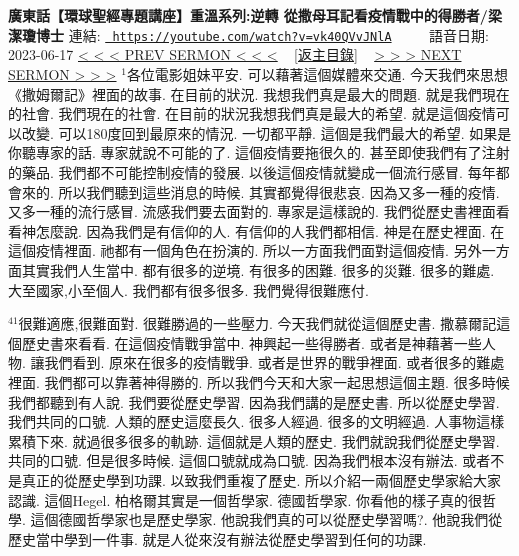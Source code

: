 \documentclass{book}
\begin{document}
\section{}
\label{sec:vk40QVvJNlA}
\textbf{廣東話【環球聖經專題講座】重溫系列:逆轉 從撒母耳記看疫情戰中的得勝者/梁潔瓊博士}
\newline
\newline
連結: \href{https://youtube.com/watch?v=vk40QVvJNlA}{\texttt{ https://youtube.com/watch?v=vk40QVvJNlA}} ~~~~ 語音日期: 2023-06-17 
\newline
\newline
\hyperref[sec:ok2q_ar3Xrg]{\small{< < < PREV SERMON < < <}}
~
\hyperref[sec:index]{\small{[返主目錄]}}
~
\hyperref[sec:SwgE3Jqj0fE]{\small{> > > NEXT SERMON > > >}}
\newline
\newline
$^{1}$各位電影姐妹平安.
可以藉著這個媒體來交通.
今天我們來思想《撒姆爾記》裡面的故事.
在目前的狀況.
我想我們真是最大的問題.
就是我們現在的社會.
我們現在的社會.
在目前的狀況我想我們真是最大的希望.
就是這個疫情可以改變.
可以180度回到最原來的情況.
一切都平靜.
這個是我們最大的希望.
如果是你聽專家的話.
專家就說不可能的了.
這個疫情要拖很久的.
甚至即使我們有了注射的藥品.
我們都不可能控制疫情的發展.
以後這個疫情就變成一個流行感冒.
每年都會來的.
所以我們聽到這些消息的時候.
其實都覺得很悲哀.
因為又多一種的疫情.
又多一種的流行感冒.
流感我們要去面對的.
專家是這樣說的.
我們從歷史書裡面看看神怎麼說.
因為我們是有信仰的人.
有信仰的人我們都相信.
神是在歷史裡面.
在這個疫情裡面.
祂都有一個角色在扮演的.
所以一方面我們面對這個疫情.
另外一方面其實我們人生當中.
都有很多的逆境.
有很多的困難.
很多的災難.
很多的難處.
大至國家,小至個人.
我們都有很多很多.
我們覺得很難應付.

$^{41}$很難適應,很難面對.
很難勝過的一些壓力.
今天我們就從這個歷史書.
撒慕爾記這個歷史書來看看.
在這個疫情戰爭當中.
神興起一些得勝者.
或者是神藉著一些人物.
讓我們看到.
原來在很多的疫情戰爭.
或者是世界的戰爭裡面.
或者很多的難處裡面.
我們都可以靠著神得勝的.
所以我們今天和大家一起思想這個主題.
很多時候我們都聽到有人說.
我們要從歷史學習.
因為我們講的是歷史書.
所以從歷史學習.
我們共同的口號.
人類的歷史這麼長久.
很多人經過.
很多的文明經過.
人事物這樣累積下來.
就過很多很多的軌跡.
這個就是人類的歷史.
我們就說我們從歷史學習.
共同的口號.
但是很多時候.
這個口號就成為口號.
因為我們根本沒有辦法.
或者不是真正的從歷史學到功課.
以致我們重複了歷史.
所以介紹一兩個歷史學家給大家認識.
這個Hegel.
柏格爾其實是一個哲學家.
德國哲學家.
你看他的樣子真的很哲學.
這個德國哲學家也是歷史學家.
他說我們真的可以從歷史學習嗎?.
他說我們從歷史當中學到一件事.
就是人從來沒有辦法從歷史學習到任何的功課.
\end{document}
